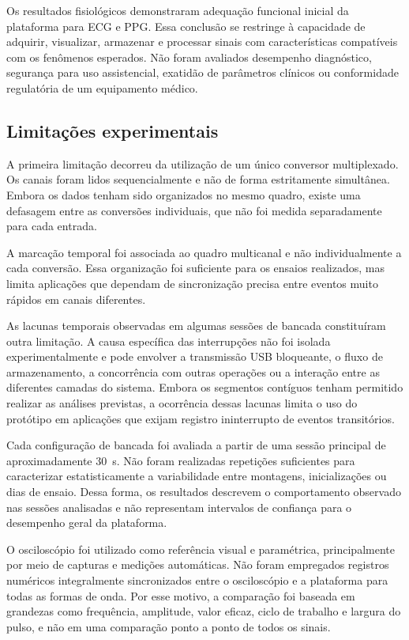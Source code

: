 \documentclass[a4paper,12pt]{fcte}
\begin{document}
Os resultados fisiológicos demonstraram adequação funcional inicial da plataforma para ECG e PPG. Essa conclusão se restringe à capacidade de adquirir, visualizar, armazenar e processar sinais com características compatíveis com os fenômenos esperados. Não foram avaliados desempenho diagnóstico, segurança para uso assistencial, exatidão de parâmetros clínicos ou conformidade regulatória de um equipamento médico.


\subsection{Limitações experimentais}
\label{subsec:limitacoes_experimentais}

A primeira limitação decorreu da utilização de um único conversor multiplexado. Os canais foram lidos sequencialmente e não de forma estritamente simultânea. Embora os dados tenham sido organizados no mesmo quadro, existe uma defasagem entre as conversões individuais, que não foi medida separadamente para cada entrada.

A marcação temporal foi associada ao quadro multicanal e não individualmente a cada conversão. Essa organização foi suficiente para os ensaios realizados, mas limita aplicações que dependam de sincronização precisa entre eventos muito rápidos em canais diferentes.

As lacunas temporais observadas em algumas sessões de bancada constituíram outra limitação. A causa específica das interrupções não foi isolada experimentalmente e pode envolver a transmissão USB bloqueante, o fluxo de armazenamento, a concorrência com outras operações ou a interação entre as diferentes camadas do sistema. Embora os segmentos contíguos tenham permitido realizar as análises previstas, a ocorrência dessas lacunas limita o uso do protótipo em aplicações que exijam registro ininterrupto de eventos transitórios.

Cada configuração de bancada foi avaliada a partir de uma sessão principal de aproximadamente 30~s. Não foram realizadas repetições suficientes para caracterizar estatisticamente a variabilidade entre montagens, inicializações ou dias de ensaio. Dessa forma, os resultados descrevem o comportamento observado nas sessões analisadas e não representam intervalos de confiança para o desempenho geral da plataforma.

O osciloscópio foi utilizado como referência visual e paramétrica, principalmente por meio de capturas e medições automáticas. Não foram empregados registros numéricos integralmente sincronizados entre o osciloscópio e a plataforma para todas as formas de onda. Por esse motivo, a comparação foi baseada em grandezas como frequência, amplitude, valor eficaz, ciclo de trabalho e largura do pulso, e não em uma comparação ponto a ponto de todos os sinais.
\end{document}
